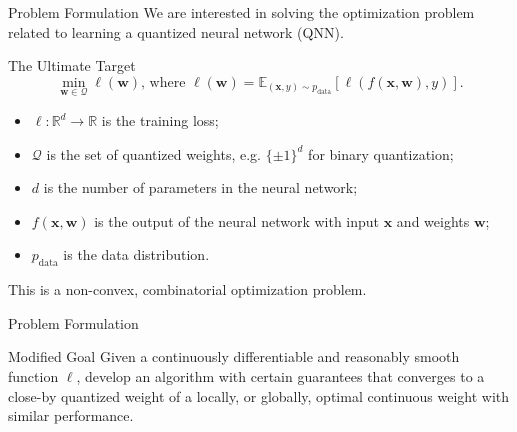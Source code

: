 \documentclass[aspectratio=169,xcolor=dvipsnames]{beamer}
\begin{document}
\begin{frame}{Problem Formulation}
    We are interested in solving the optimization problem related to learning a quantized neural network (QNN).

    \begin{block}{The Ultimate Target}
        \[\min_{\mathbf{w}\in\mathcal{Q}} \ell(\mathbf{w})\text{, where }\ell(\mathbf{w})=\mathbb{E}_{(\mathbf{x},y)\sim p_{\text{data}}} [\ell(f(\mathbf{x},\mathbf{w}), y)].\]
        \begin{itemize}
            \item $\ell:\mathbb{R}^d\to \mathbb{R}$ is the training loss;
            \item $\mathcal{Q}$ is the set of quantized weights, e.g. $\{\pm 1\}^d$ for binary quantization;
            \item $d$ is the number of parameters in the neural network;
            \item $f(\mathbf{x},\mathbf{w})$ is the output of the neural network with input $\mathbf{x}$ and weights $\mathbf{w}$;
            \item $p_{\text{data}}$ is the data distribution.
        \end{itemize}
    \end{block}

    This is a non-convex, combinatorial optimization problem.
\end{frame}

\begin{frame}{Problem Formulation}
    \begin{alertblock}{Modified Goal}
        Given a continuously differentiable and reasonably smooth function $\ell$, develop an algorithm
        with certain guarantees that converges to a close-by quantized weight of a locally, or globally, optimal
        continuous weight with similar performance.
    \end{alertblock}



\end{frame}


\end{document}
